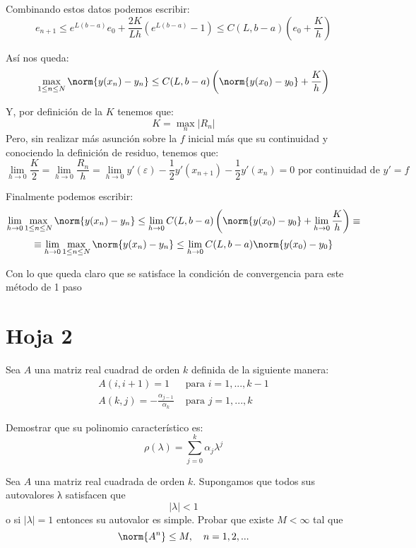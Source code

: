 \begin{problem}[2]
Combinando estos datos podemos escribir:
\[e_{n+1} \leq e^{L(b-a)}e_0+\frac{2K}{Lh}\left( e^{L(b-a)}-1\right) \leq C(L,b-a)\left( e_0 +\frac{K}{h}\right)\]

Así nos queda:
\[\max_{1\leq n \leq N} \norm{y(x_n)-y_n} \leq C(L,b-a)\left( \norm{y(x_0)-y_0} +\frac{K}{h}\right)\]

Y, por definición de la $K$ tenemos que:
\[K = \max_n |R_n|\]
Pero, sin realizar más asunción sobre la $f$ inicial más que su continuidad y conociendo la definición de residuo, tenemos que:
\[\lim_{h\to 0} \frac{K}{2} = \lim_{h \to 0} \frac{R_n}{h} = \lim_{h \to 0} y'(ε)-\frac{1}{2}y'(x_{n+1})-\frac{1}{2}y'(x_n) = 0 \text{ por continuidad de } y'=f\]

Finalmente podemos escribir:
\[\lim_{h\to 0}\max_{1\leq n \leq N} \norm{y(x_n)-y_n} \leq \lim_{h \to 0}C(L,b-a)\left( \norm{y(x_0)-y_0} +\lim_{h \to 0}\frac{K}{h}\right) \equiv\]
\[\equiv \lim_{h\to 0}\max_{1\leq n \leq N} \norm{y(x_n)-y_n} \leq \lim_{h \to 0}C(L,b-a) \norm{y(x_0)-y_0} \]

Con lo que queda claro que se satisface la condición de convergencia para este método de 1 paso
\end{problem}

\section{Hoja 2}
\begin{problem}[1]
Sea $A$ una matriz real cuadrad de orden $k$ definida de la siguiente manera:
\[\begin{array}{ll}
A(i,i+1) = 1 & \text{ para } i=1,...,k-1\\
A(k,j)=-\frac{α_{j-1}}{α_k} & \text{ para } j=1,...,k
\end{array}\]

Demostrar que su polinomio característico es:
\[ρ(λ) = \sum_{j=0}^kα_jλ^j\]
\solution
\end{problem}

\begin{problem}[2]
Sea $A$ una matriz real cuadrada de orden $k$. Supongamos que todos sus autovalores λ satisfacen que
\[|λ| < 1\]
o si $|λ|=1$ entonces su autovalor es simple. Probar que existe $M<\infty$ tal que
\[\norm{A^n} \leq M, \ \ \ n=1,2,...\]
\solution
\end{problem}

